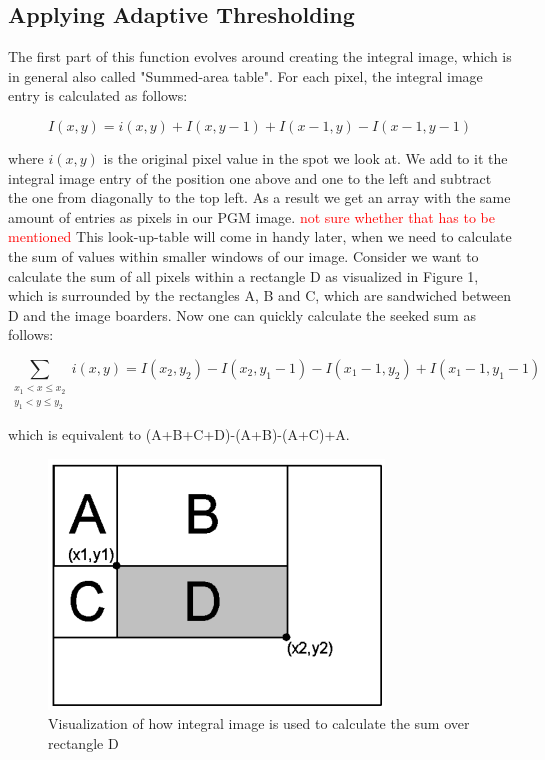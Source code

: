 \documentclass[sigconf]{acmart}
\begin{document}
\subsection{Applying Adaptive Thresholding}

The first part of this function evolves around creating the integral image, which is in general also called "Summed-area table". For each pixel, the integral image entry is calculated as follows:

$${\displaystyle I(x,y)=i(x,y)+I(x,y-1)+I(x-1,y)-I(x-1,y-1)}$$

where $i(x,y)$ is the original pixel value in the spot we look at. We add to it the integral image entry of the position one above and one to the left and subtract the one from diagonally to the top left. As a result we get an array with the same amount of entries as pixels in our PGM image. \textcolor{red}{not sure whether that has to be mentioned} This look-up-table will come in handy later, when we need to calculate the sum of values within smaller windows of our image. Consider we want to calculate the sum of all pixels within a rectangle D as visualized in Figure 1, which is surrounded by the rectangles A, B and C, which are sandwiched between D and the image boarders.
Now one can quickly calculate the seeked sum as follows:

$${\sum _{\substack{x_{1}<x\leq x_{2}\\y_{1}<y\leq 
y_{2}}}i(x,y)} = I(x_2,y_2) - I(x_2,y_1 - 1) - I(x_1 - 1,y_2) + I(x_1 - 1,y_1 - 1)$$


which is equivalent to (A+B+C+D)-(A+B)-(A+C)+A.

\begin{figure}[htbp]
  \centering
  \includegraphics[width=0.7\linewidth]{./graphics/rectangle.png}
  \caption{Visualization of how integral image is used to calculate the sum over rectangle D} 
\end{figure}
\end{document}
